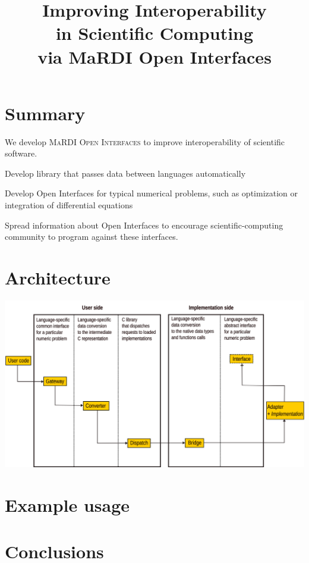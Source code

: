 \documentclass{mmposter}
\title{Improving Interoperability\\in Scientific Computing\\via MaRDI Open Interfaces}
\newcommand{\OIF}{\textsc{MaRDI Open Interfaces}\xspace}
\begin{document}


\maketitle

\section*{Summary}
We develop \OIF{} to improve interoperability of scientific software.

\begin{objectives}
  \item Develop library that passes data between languages automatically
  \item Develop Open Interfaces for typical numerical problems,
  such as optimization or integration of differential equations
  \item Spread information about Open Interfaces to encourage
  scientific-computing community to program against these interfaces.
\end{objectives}

\section*{Architecture}
\includegraphics[width=\columnwidth]{arch.png}

\newpage

\section*{Example usage}
\lipsum[2]

\section*{Conclusions}
\lipsum[3]
\end{document}
